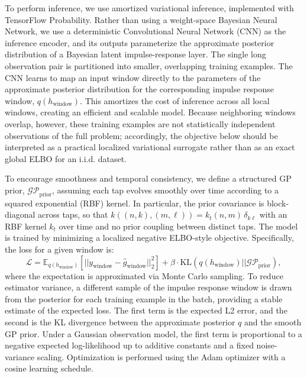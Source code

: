 \documentclass[preprint,1p,times,authoryear]{elsarticle}
\begin{document}
To perform inference, we use amortized variational inference, implemented with TensorFlow Probability. Rather than using a weight-space Bayesian Neural Network, we use a deterministic Convolutional Neural Network (CNN) as the inference encoder, and its outputs parameterize the approximate posterior distribution of a Bayesian latent impulse-response layer. The single long observation pair is partitioned into smaller, overlapping training examples. The CNN learns to map an input window directly to the parameters of the approximate posterior distribution for the corresponding impulse response window, $q(h_{\text{window}})$. This amortizes the cost of inference across all local windows, creating an efficient and scalable model. Because neighboring windows overlap, however, these training examples are not statistically independent observations of the full problem; accordingly, the objective below should be interpreted as a practical localized variational surrogate rather than as an exact global ELBO for an i.i.d. dataset.

To encourage smoothness and temporal consistency, we define a structured GP prior, $\mathcal{GP}_{\text{prior}}$, assuming each tap evolves smoothly over time according to a squared exponential (RBF) kernel. In particular, the prior covariance is block-diagonal across taps, so that $k((n,k),(m,\ell)) = k_t(n,m)\,\delta_{k\ell}$ with an RBF kernel $k_t$ over time and no prior coupling between distinct taps. The model is trained by minimizing a localized negative ELBO-style objective. Specifically, the loss for a given window is:
\begin{equation}
\mathcal{L} = \mathbb{E}_{q(h_{\text{window}})} \left[ || y_{\text{window}} - \hat{g}_{\text{window}} ||_2^2 \right] + \beta \cdot \text{KL}(q(h_{\text{window}}) || \mathcal{GP}_{\text{prior}}),
\end{equation}
where the expectation is approximated via Monte Carlo sampling. To reduce estimator variance, a different sample of the impulse response window is drawn from the posterior for each training example in the batch, providing a stable estimate of the expected loss. The first term is the expected L2 error, and the second is the KL divergence between the approximate posterior $q$ and the smooth GP prior. Under a Gaussian observation model, the first term is proportional to a negative expected log-likelihood up to additive constants and a fixed noise-variance scaling. Optimization is performed using the Adam optimizer with a cosine learning schedule.
\end{document}
